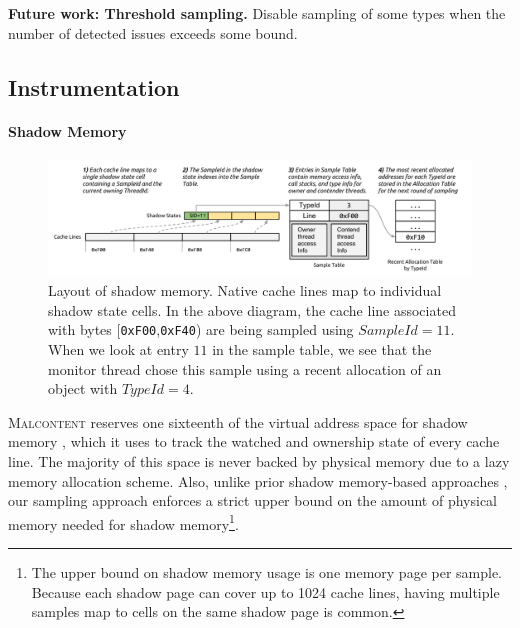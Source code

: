 \documentclass[letterpaper,twocolumn,10pt]{article}
\newcommand{\TextToolname}{Malcontent}
\newcommand{\Toolname}{\textsc{\TextToolname{}}}
\begin{document}
{\bf Future work: Threshold sampling.} Disable sampling of some types when the number of detected issues exceeds some
bound.

\subsection{Instrumentation}
\paragraph{Shadow Memory}
\begin{figure}
\includegraphics[width=\textwidth]{shadow.pdf}
\caption{\label{fig:layout_of_shadow}Layout of shadow memory. Native cache lines map to individual shadow state cells. %
 In the above %
diagram, the cache line associated with bytes [\texttt{0xF00},\texttt{0xF40}) are being sampled using $SampleId=11$. When %
we look at entry $11$ in the sample table, we see that the monitor thread chose this sample using a recent allocation of an %
object with $TypeId=4$.}
\end{figure}

\Toolname{} reserves one sixteenth of the virtual address space for shadow memory \cite{Umbra}, which it uses to track the watched and
ownership state of every cache line. The majority of this space is never backed by physical memory due to a lazy memory allocation
scheme. Also, unlike prior shadow memory-based approaches \cite{DrContention}, our sampling approach enforces a strict upper
bound on the amount of physical memory needed for shadow memory\footnote{The upper bound on shadow memory usage is one
memory page per sample. Because each shadow page can cover up to 1024 cache lines, having multiple samples map to cells on the
same shadow page is common.}.

\end{document}

